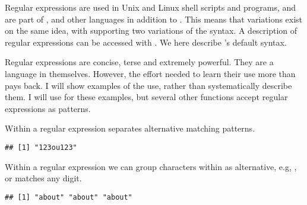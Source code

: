 \documentclass[krantz2]{krantz}\usepackage{knitr}
\begin{document}
\begin{warningbox}
Regular expressions are used in Unix and Linux shell scripts and programs, and are part of \perllang, \Cpplang and other languages in addition to \Rlang. This means that variations exist on the same idea, with \Rlang supporting two variations of the syntax. A description of \Rlang regular expressions can be accessed with . We here describe \Rlang's default syntax.
\end{warningbox}

Regular expressions are concise, terse and extremely powerful. They are a language in themselves. However, the effort needed to learn their use more than pays back. I will show examples of the use, rather than systematically describe them. I will use  for these examples, but several other \Rlang functions accept regular expressions as patterns.

Within a regular expression \code{|} separates alternative matching patterns.

\begin{knitrout}\footnotesize
{}\color{fgcolor}\begin{kframe}
\begin{alltt}
\hlstd{(} \hlstd{=} \hlstd{,}  \hlstd{=} \hlstd{,}  \hlstd{=} \hlstd{)}
\end{alltt}
\begin{verbatim}
## [1] "123ou123"
\end{verbatim}
\end{kframe}
\end{knitrout}

Within a regular expression we can group characters within \code{[ ]} as alternative, e.g, \code{[0123456789]}, or \code{[0-9]} matches any digit.

\begin{knitrout}\footnotesize
{}\color{fgcolor}\begin{kframe}
\begin{alltt}
\hlstd{(} \hlstd{=} \hlstd{,}
      \hlstd{=} \hlstd{,}
      \hlstd{=} \hlstd{(}\hlstd{,} \hlstd{,} \hlstd{))}
\end{alltt}
\begin{verbatim}
## [1] "about" "about" "about"
\end{verbatim}
\end{kframe}
\end{knitrout}
\end{document}
